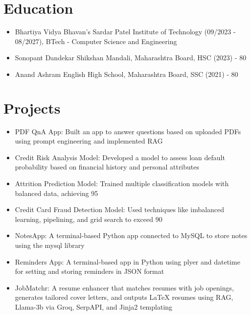 \documentclass[10pt]{article}
\begin{document}
\section*{Education}
\begin{itemize}[leftmargin=*]

  \item Bhartiya Vidya Bhavan's Sardar Patel Institute of Technology (09/2023 - 08/2027), BTech - Computer Science and Engineering

  \item Sonopant Dandekar Shikshan Mandali, Maharashtra Board, HSC (2023) - 80%

  \item Anand Ashram English High School, Maharashtra Board, SSC (2021) - 80%

\end{itemize}



\section*{Projects}
\begin{itemize}[leftmargin=*]

  \item PDF QnA App: Built an app to answer questions based on uploaded PDFs using prompt engineering and implemented RAG

  \item Credit Risk Analysis Model: Developed a model to assess loan default probability based on financial history and personal attributes

  \item Attrition Prediction Model: Trained multiple classification models with balanced data, achieving 95%

  \item Credit Card Fraud Detection Model: Used techniques like imbalanced learning, pipelining, and grid search to exceed 90%

  \item NotesApp: A terminal-based Python app connected to MySQL to store notes using the mysql library

  \item Reminders App: A terminal-based app in Python using plyer and datetime for setting and storing reminders in JSON format

  \item JobMatchr: A resume enhancer that matches resumes with job openings, generates tailored cover letters, and outputs LaTeX resumes using RAG, Llama-3b via Groq, SerpAPI, and Jinja2 templating

\end{itemize}
\end{document}
